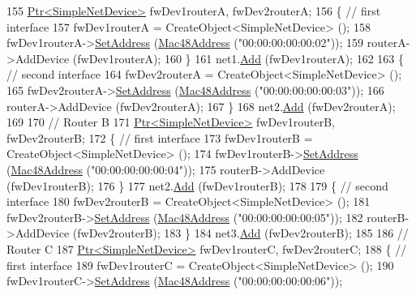 \begin{DoxyCode}
155   \hyperlink{classns3_1_1Ptr}{Ptr<SimpleNetDevice>} fwDev1routerA, fwDev2routerA;
156   \{ \textcolor{comment}{// first interface}
157     fwDev1routerA = CreateObject<SimpleNetDevice> ();
158     fwDev1routerA->\hyperlink{classns3_1_1SimpleNetDevice_a968ef3e7318bac29d5f1d7d977029af4}{SetAddress} (\hyperlink{classns3_1_1Mac48Address}{Mac48Address} (\textcolor{stringliteral}{"00:00:00:00:00:02"}));
159     routerA->AddDevice (fwDev1routerA);
160   \}
161   net1.\hyperlink{classns3_1_1NetDeviceContainer_a7ca8bc1d7ec00fd4fcc63869987fbda5}{Add} (fwDev1routerA);
162 
163   \{ \textcolor{comment}{// second interface}
164     fwDev2routerA = CreateObject<SimpleNetDevice> ();
165     fwDev2routerA->\hyperlink{classns3_1_1SimpleNetDevice_a968ef3e7318bac29d5f1d7d977029af4}{SetAddress} (\hyperlink{classns3_1_1Mac48Address}{Mac48Address} (\textcolor{stringliteral}{"00:00:00:00:00:03"}));
166     routerA->AddDevice (fwDev2routerA);
167   \}
168   net2.\hyperlink{classns3_1_1NetDeviceContainer_a7ca8bc1d7ec00fd4fcc63869987fbda5}{Add} (fwDev2routerA);
169 
170   \textcolor{comment}{// Router B}
171   \hyperlink{classns3_1_1Ptr}{Ptr<SimpleNetDevice>} fwDev1routerB, fwDev2routerB;
172   \{ \textcolor{comment}{// first interface}
173     fwDev1routerB = CreateObject<SimpleNetDevice> ();
174     fwDev1routerB->\hyperlink{classns3_1_1SimpleNetDevice_a968ef3e7318bac29d5f1d7d977029af4}{SetAddress} (\hyperlink{classns3_1_1Mac48Address}{Mac48Address} (\textcolor{stringliteral}{"00:00:00:00:00:04"}));
175     routerB->AddDevice (fwDev1routerB);
176   \}
177   net2.\hyperlink{classns3_1_1NetDeviceContainer_a7ca8bc1d7ec00fd4fcc63869987fbda5}{Add} (fwDev1routerB);
178 
179   \{ \textcolor{comment}{// second interface}
180     fwDev2routerB = CreateObject<SimpleNetDevice> ();
181     fwDev2routerB->\hyperlink{classns3_1_1SimpleNetDevice_a968ef3e7318bac29d5f1d7d977029af4}{SetAddress} (\hyperlink{classns3_1_1Mac48Address}{Mac48Address} (\textcolor{stringliteral}{"00:00:00:00:00:05"}));
182     routerB->AddDevice (fwDev2routerB);
183   \}
184   net3.\hyperlink{classns3_1_1NetDeviceContainer_a7ca8bc1d7ec00fd4fcc63869987fbda5}{Add} (fwDev2routerB);
185 
186   \textcolor{comment}{// Router C}
187   \hyperlink{classns3_1_1Ptr}{Ptr<SimpleNetDevice>} fwDev1routerC, fwDev2routerC;
188   \{ \textcolor{comment}{// first interface}
189     fwDev1routerC = CreateObject<SimpleNetDevice> ();
190     fwDev1routerC->\hyperlink{classns3_1_1SimpleNetDevice_a968ef3e7318bac29d5f1d7d977029af4}{SetAddress} (\hyperlink{classns3_1_1Mac48Address}{Mac48Address} (\textcolor{stringliteral}{"00:00:00:00:00:06"}));

\end{DoxyCode}
